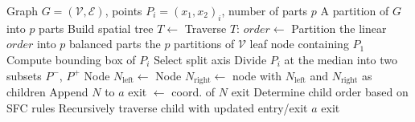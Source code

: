 \begin{algorithm}
    \caption{Adaptive Space-Filling Curve Partitioning.}
    \label{alg:adaptive_sfc}
    \begin{algorithmic}[1]
        \Require Graph \( G = (\mathcal{V}, \mathcal{E}) \), points \( P_i = (x_{1}, x_{2})_i \), number of parts \(p\)
        \Ensure A partition of \( G \) into \( p \) parts
            \State Build spatial tree \(T \gets\) 
            \State Traverse \(T\): \(order \gets\) 
            \State Partition the linear \(order\) into \(p\) balanced parts
            \State \Return the \(p\) partitions of \(\mathcal{V}\)
        \EndFunction
                \State \Return leaf node containing \(P_1\)
            \Else
                \State Compute bounding box of \(P_i\)
                \State Select split axis
                \State Divide \(P_i\) at the median into two subsets \(P^-\), \(P^+\)
                \State Node \(N_{\text{left}} \gets\) 
                \State Node \(N_{\text{right}} \gets\) 
                \State \Return node with \(N_{\text{left}}\) and \(N_{\text{right}}\) as children
            \EndIf
        \EndFunction
                \State Append \(N\) to \(a\)
                \State exit \(\gets\) coord. of \(N\)
                \State \Return exit
            \Else
                \State Determine child order based on SFC rules
                    \State Recursively traverse child with updated entry/exit
                \EndFor
                    \State \Return \(a\)
                \Else
                    \State \Return exit
                \EndIf
            \EndIf
        \EndFunction
    \end{algorithmic}
\end{algorithm}